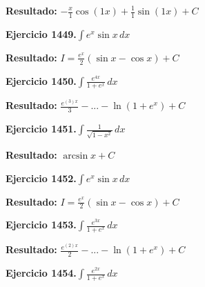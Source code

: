 \documentclass[10pt,a4paper]{article}
\begin{document}
\begin{solbox}
\textbf{Resultado:} \(\displaystyle -\frac{x}{1}\cos(1x) + \frac{1}{1}\sin(1x) + C\)
\end{solbox}

\begin{ejbox}
\textbf{Ejercicio 1449.}\quad $\int e^x\sin x\,dx$
\end{ejbox}

\begin{solbox}
\textbf{Resultado:} \(\displaystyle I = \frac{e^x}{2}(\sin x - \cos x) + C\)
\end{solbox}

\newpage
\begin{ejbox}
\textbf{Ejercicio 1450.}\quad $\int \frac{e^{4x}}{1+e^{x}}\,dx$
\end{ejbox}

\begin{solbox}
\textbf{Resultado:} \(\displaystyle \frac{e^{(3)x}}{3} - ... - \ln(1+e^x) + C\)
\end{solbox}

\begin{ejbox}
\textbf{Ejercicio 1451.}\quad $\int \frac{1}{\sqrt{1-x^2}}\,dx$
\end{ejbox}

\begin{solbox}
\textbf{Resultado:} \(\displaystyle \arcsin x + C\)
\end{solbox}

\begin{ejbox}
\textbf{Ejercicio 1452.}\quad $\int e^x\sin x\,dx$
\end{ejbox}

\begin{solbox}
\textbf{Resultado:} \(\displaystyle I = \frac{e^x}{2}(\sin x - \cos x) + C\)
\end{solbox}

\newpage
\begin{ejbox}
\textbf{Ejercicio 1453.}\quad $\int \frac{e^{3x}}{1+e^{x}}\,dx$
\end{ejbox}

\begin{solbox}
\textbf{Resultado:} \(\displaystyle \frac{e^{(2)x}}{2} - ... - \ln(1+e^x) + C\)
\end{solbox}

\begin{ejbox}
\textbf{Ejercicio 1454.}\quad $\int \frac{e^{2x}}{1+e^{x}}\,dx$
\end{ejbox}
\end{document}
